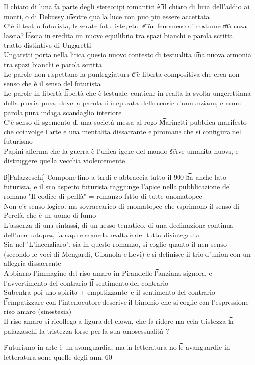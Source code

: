 \documentclass[12pt]{article}
\begin{document}
Il chiaro di luna fa parte degli stereotipi romantici \t è il chiaro di luna dell'addio ai monti, o di Debussy \t mentre qua la luce non puo piu essere accettata \\
C'è il teatro futurista, le serate futuriste, etc. \t è un fenomeno di costume \t ma cosa lascia? \t lascia in eredita un nuovo equilibrio tra spazi bianchi e parola scritta = tratto distintivo di Ungaretti \\
Ungaretti porta nella lirica questo nuovo contesto di testualita \t una nuova armonia tra spazi bianchi e parola scritta \\
Le parole non rispettano la punteggiatura \t c'è liberta compositiva che crea non senso che è il senso del futurista \\
Le parole in libertà \t libertà che è testuale, contiene in realta la svolta ungerettiana della poesia pura, dove la parola si è epurata delle scorie d'annunziane, e come parola pura indaga scandaglio interiore \\
C'è senso di sgomento di una società messa al rogo \t Marinetti pubblica manifesto che coinvolge l'arte e una mentalita dissacrante e piromane che si configura nel futurismo \\
Papini afferma che la guerra è l'unica igene del mondo \t serve umanita nuova, e distruggere quella vecchia violentemente

\ss[Palazzeschi]
Compone fino a tardi e abbraccia tutto il 900 \t ha anche lato futurista, e il suo aspetto futurista raggiunge l'apice nella pubblicazione del romano "Il codice di perllà" = romanzo fatto di tutte onomatopee \\
Non c'è senso logico, ma sovraccarico di onomatopee che esprimono il senso di Perelà, che è un uomo di fumo \\
L'assenza di una sintassi, di un nesso tematico, di una declinazione continua dell'onomatopea, fa capire come la realta è del tutto disintegrata \\
Sia nel "L'incendiaro", sia in questo romanzo, si coglie quanto il non senso (secondo le voci di Mengardi, Gioanola e Levì) e si definisce il trio d'union con un allegria dissacrante \\
Abbiamo l'immagine del riso amaro in Pirandello \t l'anziana signora, e l'avvertimento del contrario \t il sentimento del contrario \\
Subentra poi uno spirito + empatizzante, e il sentimento del contrario \t l'empatizzare con l'interlocutore descrive il binomio che si coglie con l'espressione riso amaro (sinestesia) \\
Il riso amaro si ricollega a figura del clown, che fa ridere ma cela tristezza \t in palazzeschi la tristezza forse per la sua omosessualità ?

\v

Futurismo in arte è un avanguardia, ma in letteratura no \t le avanguardie in letteratura sono quelle degli anni 60
\end{document}
